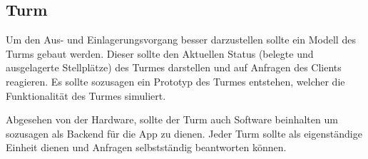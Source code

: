 \subsection{Turm}


Um den Aus- und Einlagerungsvorgang besser darzustellen sollte ein Modell des Turms gebaut werden. Dieser sollte den Aktuellen Status (belegte und ausgelagerte Stellplätze) des Turmes darstellen und auf Anfragen des Clients reagieren. Es sollte sozusagen ein Prototyp des Turmes entstehen, welcher die Funktionalität des Turmes simuliert.

Abgesehen von der Hardware, sollte der Turm auch Software beinhalten um sozusagen als Backend für die App zu dienen. Jeder Turm sollte als eigenständige Einheit dienen und Anfragen selbstständig beantworten können.






